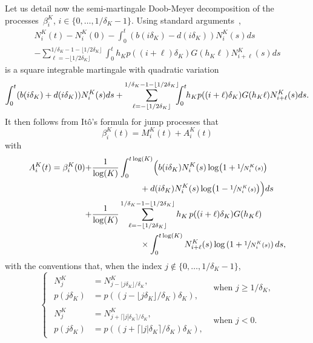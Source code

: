 \documentclass[JEP,XML,SOM,Unicode,published]{cedram}
\theoremstyle{plain}
\theoremstyle{remark}
\begin{document}
Let us detail now the semi-martingale Doob-Meyer decomposition of the processes~$\beta_{i}^K$, $i\in \{0,\dots, 1/\delta_{K}-1\}$. Using standard arguments~\cite{bansayemeleard},
\begin{multline}
N^K_i(t)-N^K_i(0)-\int_0^t(b(i\delta_K)-d(i\delta_K))N^K_i(s) ds \\ -\sum_{\ell=-\lfloor 1/2\delta_K\rfloor}^{1/\delta_K-1-\lfloor 1/2\delta_K\rfloor}\int_0^t h_Kp((i+\ell)\delta_K)G(h_{K}\ell)N^K_{i+\ell}(s)ds \label{eq:DM-N^K_i}
\end{multline}
is a square integrable martingale with quadratic variation
\[
\int_0^t(b(i\delta_K)+d(i\delta_K))N^K_i(s) ds
+\sum_{\ell=-\lfloor 1/2\delta_K\rfloor}^{1/\delta_K-1-\lfloor 1/2\delta_K\rfloor}\hspace*{-2mm}\int_0^t\hspace*{-1mm} h_Kp((i+\ell)\delta_K)G(h_{K}\ell)N^K_{i+\ell}(s)ds.
\]
It then follows from Itô's formula for jump processes that
\begin{equation}\label{decomposition}
\beta_{i}^K(t)=M^K_{i}(t) + A^K_{i}(t)
\end{equation}
with
\begin{align} A_{i}^K(t)= \beta_{i}^K(0) + & \frac{1}{\log(K)}\int_{0}^{t\log(K)}\Bigl(b(i \delta_{K})N^K_{i}(s) \log\bigl(1+\sfrac{1}{N^K_{i}(s)}\bigr) \label{def:A}\\
& \hspace{2cm}+ d(i \delta_{K})N^K_{i}(s) \log\bigl(1-\sfrac{1}{N^K_{i}(s)}\bigr)\Bigr) ds \\
+ & \frac{1}{\log(K)} \sum_{\ell=-\lfloor 1/2\delta_K\rfloor}^{1/\delta_K-1-\lfloor 1/2\delta_K\rfloor}
h_{K}\, p((i+\ell) \delta_{K}) G(h_{K}\ell) \\
& \hspace{2cm} \times \int_{0}^{t\log(K)}N^K_{i+\ell}(s)\log\left(1+\sfrac{1}{N^K_{i}(s)}\right) ds ,
\end{align}
with the conventions that, when the index $j\notin \{0,\dots, 1/\delta_K-1\}$,
\begin{equation}\label{eq:convention}
\begin{cases}
\begin{aligned}
N^K_{j}&=N^K_{j-\lfloor j\delta_K\rfloor/
\delta_K},\\
p(j\delta_K)&=p((j-\lfloor j\delta_K\rfloor/
\delta_K)\delta_K),
\end{aligned}
&\text{when }j\geq 1/\delta_K, \\[10pt]
\begin{aligned}
N^K_{j}&=N^K_{j+\lceil | j|\delta_K\rceil/
\delta_K},\\
p(j\delta_K)&=p((j+\lceil |j|\delta_K\rceil/
\delta_K)\delta_K),
\end{aligned}
&\text{when }j<0. 
\end{cases}
\end{equation}
\end{document}
